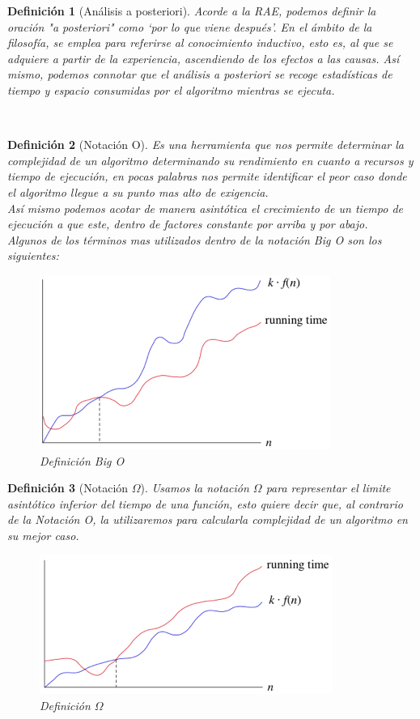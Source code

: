 \documentclass[12pt,twoside]{article}
\newtheorem{defi}{Definición}
\begin{document}
\clearpage
\begin{defi}[Análisis a posteriori]
Acorde a la RAE, podemos definir la oraci\'on "a posteriori" como  ‘por lo que viene después’. En el ámbito de la filosofía, se emplea para referirse al conocimiento inductivo, esto es, al que se adquiere a partir de la experiencia, ascendiendo de los efectos a las causas.
Así mismo, podemos connotar que el an\'alisis a posteriori se recoge estadísticas de tiempo y espacio consumidas por el algoritmo mientras se ejecuta. 
\end{defi}
\\
\begin{defi}[Notaci\'on O]
Es una herramienta que nos permite determinar la complejidad de un algoritmo determinando su rendimiento en cuanto a recursos y tiempo de ejecución, en pocas palabras nos permite identificar el peor caso donde el algoritmo llegue a su punto mas alto de exigencia.
\\
Así mismo podemos acotar de manera asintótica el crecimiento de un tiempo de ejecución a que este, dentro de factores constante por arriba y por abajo.
\\
Algunos de los términos mas utilizados dentro de la notación Big O son los siguientes:
\\
\begin{figure}[h!]
\centering
\includegraphics[scale=1.5]{big o.png}
\caption{Definici\'on Big O}
\label{fig:universe}
\end{figure}
\end{defi}
\clearpage
\begin{defi}[Notaci\'on $\Omega$]
Usamos la notación $\Omega$ para representar el limite asintótico inferior del tiempo de una funci\'on, esto quiere decir que, al contrario de la Notaci\'on O, la utilizaremos para calcularla complejidad de un algoritmo en su mejor caso.
\begin{figure}[h!]
\centering
\includegraphics[scale=1.5]{big omega.png}
\caption{Definici\'on $\Omega$}
\label{fig:universe}
\end{figure}
\end{defi}
\end{document}
